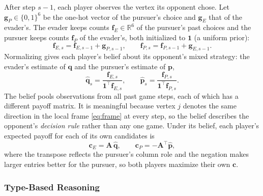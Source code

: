 \documentclass[letterpaper, 10 pt, conference]{ieeeconf}  %
\begin{document}
After step $s-1$, each player observes the vertex its opponent chose. Let $\mathbf{g}_P \in \{0,1\}^6$ be the one-hot vector of the pursuer's choice and $\mathbf{g}_E$ that of the evader's. The evader keeps counts $\mathbf{f}_E \in \mathbb{R}^6$ of the pursuer's past choices and the pursuer keeps counts $\mathbf{f}_P$ of the evader's, both initialized to $\mathbf{1}$ (a uniform prior):
%
\begin{equation}
    \mathbf{f}_{E,s} = \mathbf{f}_{E,s-1} + \mathbf{g}_{P,s-1}, \qquad
    \mathbf{f}_{P,s} = \mathbf{f}_{P,s-1} + \mathbf{g}_{E,s-1} .
\end{equation}
%
Normalizing gives each player's belief about its opponent's mixed strategy: the evader's estimate of $\mathbf{q}$ and the pursuer's estimate of $\mathbf{p}$,
%
\begin{equation}
    \hat{\mathbf{q}}_s = \frac{\mathbf{f}_{E,s}}{\mathbf{1}^\top \mathbf{f}_{E,s}}, \qquad
    \hat{\mathbf{p}}_s = \frac{\mathbf{f}_{P,s}}{\mathbf{1}^\top \mathbf{f}_{P,s}} .
    \label{eq:belief}
\end{equation}
%
The belief pools observations from all past game steps, each of which has a different payoff matrix. It is meaningful because vertex $j$ denotes the same direction in the local frame \eqref{eq:frame} at every step, so the belief describes the opponent's \emph{decision rule} rather than any one game. Under its belief, each player's expected payoff for each of its own candidates is
%
\begin{equation}
    \mathbf{c}_E = \mathbf{A}\,\hat{\mathbf{q}}, \qquad
    \mathbf{c}_P = -\mathbf{A}^\top \hat{\mathbf{p}},
    \label{eq:best_response}
\end{equation}
%
where the transpose reflects the pursuer's column role and the negation makes larger entries better for the pursuer, so both players maximize their own $\mathbf{c}$.

\subsubsection{Type-Based Reasoning}
\label{sec:types}
\end{document}
